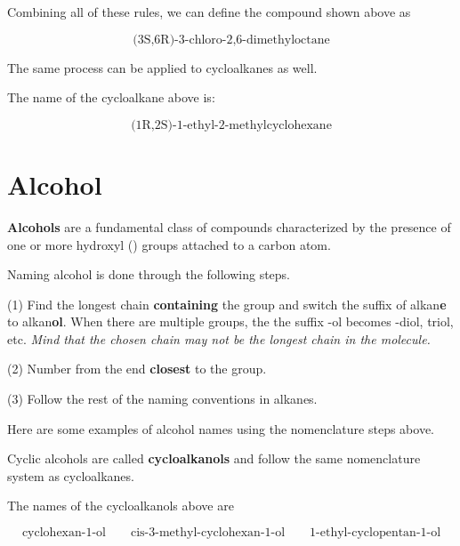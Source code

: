 \documentclass[10pt]{article}
\begin{document}

  Combining all of these rules, we can define the compound shown above as

  \[
      \text{(3S,6R)-3-chloro-2,6-dimethyloctane}
  \]

  The same process can be applied to cycloalkanes as well.


  The name of the cycloalkane above is:

  \[
      \text{(1R,2S)-1-ethyl-2-methylcyclohexane}
  \]

\section{Alcohol}

  \textbf{Alcohols} are a fundamental class of compounds characterized by the presence of one or more hydroxyl () groups attached to a carbon atom.

  Naming alcohol is done through the following steps.

  (1) Find the longest chain \textbf{containing} the  group and switch the suffix of alkan\textbf{e} to alkan\textbf{ol}. When there are multiple  groups, the the suffix -ol becomes -diol, triol, etc. \textit{Mind that the chosen chain may not be the longest chain in the molecule.}

  (2) Number from the end \textbf{closest} to the  group.

  (3) Follow the rest of the naming conventions in alkanes.

  Here are some examples of alcohol names using the nomenclature steps above.
  
  
  Cyclic alcohols are called \textbf{cycloalkanols} and follow the same nomenclature system as cycloalkanes. 


  The names of the cycloalkanols above are 
  
  \[
      \text{cyclohexan-1-ol}\qquad\text{cis-3-methyl-cyclohexan-1-ol}\qquad\text{1-ethyl-cyclopentan-1-ol}
  \]
  
\end{document}
